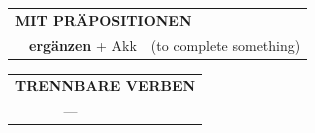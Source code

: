 \documentclass[10pt,a4paper]{revtex4-2}
\begin{document}
\begin{verbbox}
\vspace{10pt}

\begin{tabular}{lll}
\multicolumn{3}{l}{\textbf{MIT PRÄPOSITIONEN}}\\
& \textbf{ergänzen} + Akk & (to complete something)\\
\end{tabular}
\hfill
\begin{tabular}{lll}
\multicolumn{3}{l}{\textbf{TRENNBARE VERBEN}}\\
& ---\\
\end{tabular}

\vspace{-5pt}
\end{verbbox}

\end{document}
